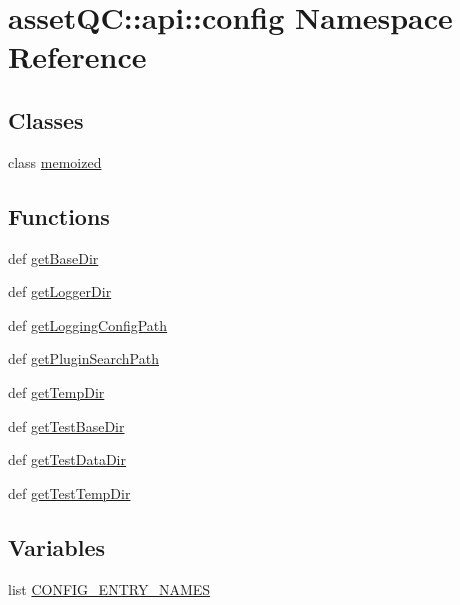 \hypertarget{namespaceassetQC_1_1api_1_1config}{\section{asset\-Q\-C\-:\-:api\-:\-:config \-Namespace \-Reference}
\label{de/d2b/namespaceassetQC_1_1api_1_1config}
}
\subsection*{\-Classes}
\begin{DoxyCompactItemize}
\item 
class \hyperlink{classassetQC_1_1api_1_1config_1_1memoized}{memoized}
\end{DoxyCompactItemize}
\subsection*{\-Functions}
\begin{DoxyCompactItemize}
\item 
def \hyperlink{namespaceassetQC_1_1api_1_1config_a7f8fd6ff8eaea6aacd15b80c097cec52}{get\-Base\-Dir}
\item 
def \hyperlink{namespaceassetQC_1_1api_1_1config_a65412a42f0f2887c8a38717d449f742d}{get\-Logger\-Dir}
\item 
def \hyperlink{namespaceassetQC_1_1api_1_1config_a34c6fbd761f82030bd5b0d14a735bb27}{get\-Logging\-Config\-Path}
\item 
def \hyperlink{namespaceassetQC_1_1api_1_1config_a2bee437affbf9ed05fe4f18012f27274}{get\-Plugin\-Search\-Path}
\item 
def \hyperlink{namespaceassetQC_1_1api_1_1config_a26bbd66eeb76bf03017a802bbde8b740}{get\-Temp\-Dir}
\item 
def \hyperlink{namespaceassetQC_1_1api_1_1config_aa47ecdd11444fcd88ff5185f3bb4e07c}{get\-Test\-Base\-Dir}
\item 
def \hyperlink{namespaceassetQC_1_1api_1_1config_aa4804f114a0cb6cc046334b34901dea4}{get\-Test\-Data\-Dir}
\item 
def \hyperlink{namespaceassetQC_1_1api_1_1config_acdb9e1cd679c8981a11b3ffedc2bc55e}{get\-Test\-Temp\-Dir}
\end{DoxyCompactItemize}
\subsection*{\-Variables}
\begin{DoxyCompactItemize}
\item 
list \hyperlink{namespaceassetQC_1_1api_1_1config_a929757ed802120d5a3e85a78b8ac7b65}{\-C\-O\-N\-F\-I\-G\-\_\-\-E\-N\-T\-R\-Y\-\_\-\-N\-A\-M\-E\-S}
\end{DoxyCompactItemize}


